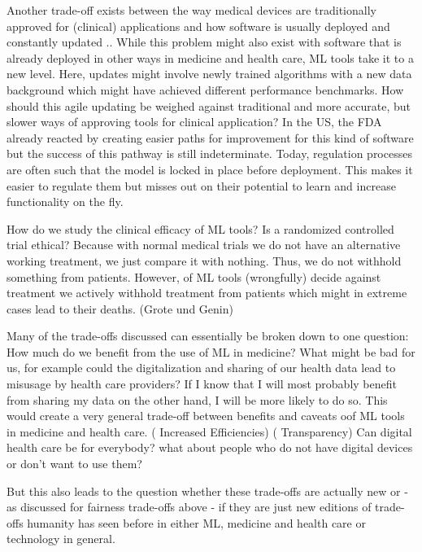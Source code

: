 Another trade-off exists between the way medical devices are traditionally approved for (clinical) applications and how software is usually deployed and constantly updated \cite{he2019practical}.. While this problem might also exist with software that is already deployed in other ways in medicine and health care, ML tools take it to a new level. Here, updates might involve newly trained algorithms with a new data background which might have achieved different performance benchmarks. How should this agile updating be weighed against traditional and more accurate, but slower ways of approving tools for clinical application? In the US, the FDA already reacted by creating easier paths for improvement for this kind of software but the success of this pathway is still indeterminate.
Today, regulation processes are often such that the model is locked in place before deployment. This makes it easier to regulate them but misses out on their potential to learn and increase functionality on the fly. 

How do we study the clinical efficacy of ML tools? Is a randomized controlled trial ethical? Because with normal medical trials we do not have an alternative working treatment, we just compare it with nothing. Thus, we do not withhold something from patients. However, of ML tools (wrongfully) decide against treatment we actively withhold treatment from patients which might in extreme cases lead to their deaths. (Grote und Genin)


 Many of the trade-offs discussed can essentially be broken down to one question: How much do we benefit from the use of ML in medicine? What might be bad for us, for example could the digitalization and sharing of our health data lead to misusage by health care providers? If I know that I will most probably benefit from sharing my data on the other hand, I will be more likely to do so. This would create a very general trade-off between benefits and caveats oof ML tools in medicine and health care. (\cite{topol2019high} Increased Efficiencies) (\cite{he2019practical} Transparency)
Can digital health care be for everybody? what about people who do not have digital devices or don't want to use them?

But this also leads to the question whether these trade-offs are actually new or - as discussed for fairness trade-offs above - if they are just new editions of trade-offs humanity has seen before in either ML, medicine and health care or technology in general.

